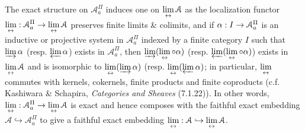 \documentclass[deligne.tex]{subfiles}
\begin{document}
The exact structure on $\mathcal A_a^\Pi$ induces one on $\displaystyle\lim_{\leftrightarrow}\mathcal A$ 
as the localization functor $\displaystyle\lim_{\leftrightarrow}:\mathcal A_a^\Pi\rightarrow\displaystyle\lim_{\leftrightarrow}\mathcal A$
preserves finite limits \& colimits, and if $\alpha:I\rightarrow\mathcal A_a^\Pi$ is
an inductive or projective system in $\mathcal A_a^\Pi$ indexed by a finite
category $I$ such that $\varinjlim\alpha$ (resp. $\varprojlim\alpha$) exists
in $\mathcal A_a^\Pi$, then $\varinjlim(\displaystyle\lim_{\leftrightarrow}\circ\alpha)$
(resp. $\varprojlim(\displaystyle\lim_{\leftrightarrow}\circ\alpha)$) exists in $\displaystyle\lim_{\leftrightarrow}\mathcal A$ and
is isomorphic to $\displaystyle\lim_{\leftrightarrow}(\varinjlim\alpha)$
(resp. $\displaystyle\lim_{\leftrightarrow}(\varprojlim\alpha)$; in particular, $\displaystyle\lim_{\leftrightarrow}$ commutes
with kernels, cokernels, finite products and finite coproducts
(c.f. Kashiwara \& Schapira, \emph{Categories and Sheaves} (7.1.22)).
In other words, $\displaystyle\lim_{\leftrightarrow}:\mathcal A_a^\Pi\rightarrow\displaystyle\lim_{\leftrightarrow}\mathcal A$ is exact and 
hence composes with the faithful exact embedding
$\mathcal A\hookrightarrow\mathcal A_a^\Pi$ to give a
faithful exact embedding $\displaystyle\lim_{\leftrightarrow}:\mathcal A\hookrightarrow\displaystyle\lim_{\leftrightarrow}\mathcal A$.
\end{document}
